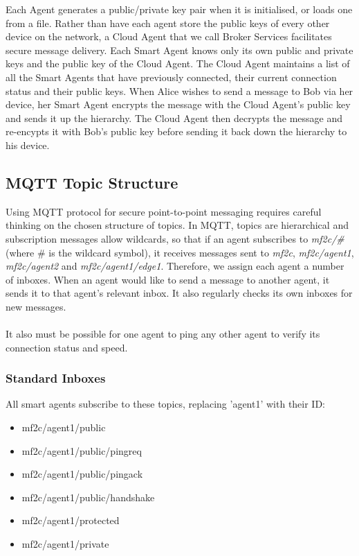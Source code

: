 Each Agent generates a public/private key pair when it is initialised, or loads one from a file. Rather than have each agent store the public keys of every other device on the network, a Cloud Agent that we call Broker Services facilitates secure message delivery. Each Smart Agent knows only its own public and private keys and the public key of the Cloud Agent. The Cloud Agent maintains a list of all the Smart Agents that have previously connected, their current connection status and their public keys. When Alice wishes to send a message to Bob via her device, her Smart Agent encrypts the message with the Cloud Agent's public key and sends it up the hierarchy. The Cloud Agent then decrypts the message and re-encypts it with Bob's public key before sending it back down the hierarchy to his device.



\subsection{MQTT Topic Structure}


Using MQTT protocol for secure point-to-point messaging requires careful thinking on the chosen structure of topics. In MQTT, topics are hierarchical and subscription messages allow wildcards, so that if an agent subscribes to \textit{mf2c/\#} (where \# is the wildcard symbol), it receives messages sent to \textit{mf2c}, \textit{mf2c/agent1}, \textit{mf2c/agent2} and \textit{mf2c/agent1/edge1}. Therefore, we assign each agent a number of inboxes. When an agent would like to send a message to another agent, it sends it to that agent's relevant inbox. It also regularly checks its own inboxes for new messages.

\paragraph{}
It also must be possible for one agent to ping any other agent to verify its connection status and speed.


\subsubsection{Standard Inboxes}
All smart agents subscribe to these topics, replacing 'agent1' with their ID:
\begin{itemize}
    \item mf2c/agent1/public
    \item mf2c/agent1/public/pingreq
    \item mf2c/agent1/public/pingack
    \item mf2c/agent1/public/handshake
    \item mf2c/agent1/protected
    \item mf2c/agent1/private
\end{itemize}

